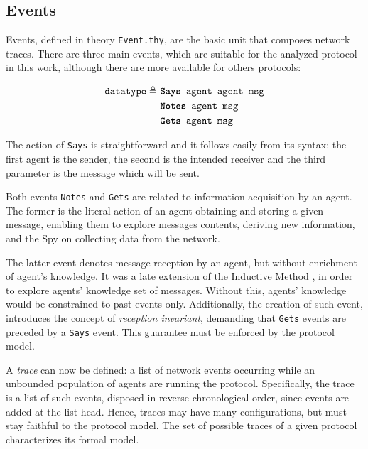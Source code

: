\subsection{Events}
Events, defined in theory \texttt{Event.thy}, are the basic unit that composes network traces. There are three main events, which are suitable for the analyzed protocol in this work, although there are more available for others protocols:

\begin{equation*}
  \begin{split}
    \texttt{datatype} \triangleq\
    & \texttt{\textbf{Says} agent agent msg} \\
    & \texttt{\textbf{Notes} agent msg} \\
    & \texttt{\textbf{Gets} agent msg}
  \end{split}
\end{equation*}

The action of \texttt{Says} is straightforward and it follows easily from its syntax: the first agent is the sender, the second is the intended receiver and the third parameter is the message which will be sent.

Both events \texttt{Notes} and \texttt{Gets} are related to information acquisition by an agent. The former is the literal action of an agent obtaining and storing a given message, enabling them to explore messages contents, deriving new information, and the Spy on collecting data from the network.

The latter event denotes message reception by an agent, but without enrichment of agent's knowledge. It was a late extension of the Inductive Method \cite[Ch. 8]{Bella2007}, in order to explore agents' knowledge set of messages. Without this, agents' knowledge would be constrained to past events only. Additionally, the creation of such event, introduces the concept of \textit{reception invariant}, demanding that \texttt{Gets} events are preceded by a \texttt{Says} event. This guarantee must be enforced by the protocol model.

A \textit{trace} can now be defined: a list of network events occurring while an unbounded population of agents are running the protocol. Specifically, the trace is a list of such events, disposed in reverse chronological order, since events are added at the list head. Hence, traces may have many configurations, but must stay faithful to the protocol model. The set of possible traces of a given protocol characterizes its formal model.

